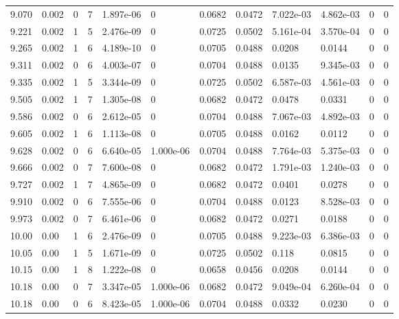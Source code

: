 \documentclass[preview]{standalone}
\begin{document}
{{{{{\begin{tabular}{L{1.2cm}C{1.2cm} C{0.3cm}C{0.5cm} C{1.4cm}C{1.4cm} C{1.4cm}C{1.4cm} C{1.6cm}C{1.6cm} C{1.6cm}C{1.6cm}}
  9.070  &  0.002  & 0     &  7 &  1.897e-06  & 0  &  0.0682&   0.0472& 7.022e-03 & 4.862e-03   &  0 & 0  \\ 
  9.221  &  0.002  & 1     &  5 &  2.476e-09  & 0  &  0.0725&   0.0502& 5.161e-04 & 3.570e-04   &  0 & 0  \\ 
  9.265  &  0.002  & 1     &  6 &  4.189e-10  & 0  &  0.0705&   0.0488& 0.0208 & 0.0144   &  0 & 0  \\ 
  9.311  &  0.002  & 0     &  6 &  4.003e-07  & 0  &  0.0704&   0.0488& 0.0135 & 9.345e-03   &  0 & 0  \\ 
  9.335  &  0.002  & 1     &  5 &  3.344e-09  & 0  &  0.0725&   0.0502& 6.587e-03 & 4.561e-03   &  0 & 0  \\ 
  9.505  &  0.002  & 1     &  7 &  1.305e-08  & 0  &  0.0682&   0.0472& 0.0478 & 0.0331   &  0 & 0  \\ 
  9.586  &  0.002  & 0     &  6 &  2.612e-05  & 0  &  0.0704&   0.0488& 7.067e-03 & 4.892e-03   &  0 & 0  \\ 
  9.605  &  0.002  & 1     &  6 &  1.113e-08  & 0  &  0.0705&   0.0488& 0.0162 & 0.0112   &  0 & 0  \\ 
  9.628  &  0.002  & 0     &  6 &  6.640e-05  & 1.000e-06  &  0.0704&   0.0488& 7.764e-03 & 5.375e-03   &  0 & 0  \\ 
  9.666  &  0.002  & 0     &  7 &  7.600e-08  & 0  &  0.0682&   0.0472& 1.791e-03 & 1.240e-03   &  0 & 0  \\ 
  9.727  &  0.002  & 1     &  7 &  4.865e-09  & 0  &  0.0682&   0.0472& 0.0401 & 0.0278   &  0 & 0  \\ 
  9.910  &  0.002  & 0     &  6 &  7.555e-06  & 0  &  0.0704&   0.0488& 0.0123 & 8.528e-03   &  0 & 0  \\ 
  9.973  &  0.002  & 0     &  7 &  6.461e-06  & 0  &  0.0682&   0.0472& 0.0271 & 0.0188   &  0 & 0  \\ 
  10.00  &  0.00  & 1     &  6 &  2.476e-09  & 0  &  0.0705&   0.0488& 9.223e-03 & 6.386e-03   &  0 & 0  \\ 
  10.05  &  0.00  & 1     &  5 &  1.671e-09  & 0  &  0.0725&   0.0502& 0.118 & 0.0815   &  0 & 0  \\ 
  10.15  &  0.00  & 1     &  8 &  1.222e-08  & 0  &  0.0658&   0.0456& 0.0208 & 0.0144   &  0 & 0  \\ 
  10.18  &  0.00  & 0     &  7 &  3.347e-05  & 1.000e-06  &  0.0682&   0.0472& 9.049e-04 & 6.260e-04   &  0 & 0  \\ 
  10.18  &  0.00  & 0     &  6 &  8.423e-05  & 1.000e-06  &  0.0704&   0.0488& 0.0332 & 0.0230   &  0 & 0  \\ 

\end{tabular}}}}}}
\end{document}
